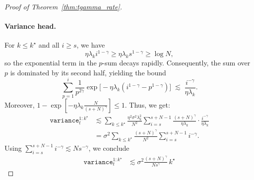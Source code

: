 \documentclass{article}
\def\variance{\mathtt{variance}}
\def\variance{\mathtt{variance}}
\theoremstyle{plain}
\def\variance{\mathtt{variance}}
\begin{document}
\begin{proof}[Proof of Theorem~\ref{thm:tgamma_rate}]
\paragraph{Variance head.}
For \(k \le k^\star\) and all \(i \ge s\), we have
\[
\eta \lambda_k i^{1-\gamma} \ge \eta \lambda_k s^{1-\gamma} \ge \log N,
\]
so the exponential term in the \(p\)-sum decays rapidly. Consequently, the sum
over \(p\) is dominated by its second half, yielding the bound
\[
\sum_{p=1}^{i} \frac{1}{p^{2\gamma}}
\exp\Big[-\eta \lambda_k(i^{1-\gamma} - p^{1-\gamma})\Big]
\;\lesssim\;
\frac{i^{-\gamma}}{\eta \lambda_k}.
\]
Moreover,
\(
1 - \exp[-\eta \lambda_k \tfrac{N}{(s+N)^\gamma}] \le 1
\).
Thus, we get:
\begin{align*}
\variance_t^{1:k^\star}
&\lesssim
\sum_{k\le k^\star}
\frac{\eta^2 \sigma^2 \lambda_k^2}{N^2}
\sum_{i=s}^{s+N-1}
\frac{(s+N)^\gamma}{\eta \lambda_k}
\cdot
\frac{i^{-\gamma}}{\eta \lambda_k} \\
&=
\sigma^2
\sum_{k\le k^\star}
\frac{(s+N)^\gamma}{N^2}
\sum_{i=s}^{s+N-1} i^{-\gamma}.
\end{align*}
Using \(\sum_{i=s}^{s+N-1} i^{-\gamma} \lesssim N s^{-\gamma}\), we conclude
\begin{align*}
\variance_t^{1:k^\star}
&\lesssim
\sigma^2
\frac{(s+N)^\gamma}{N s^\gamma}\, k^\star
\label{eq:var_head_clean}
\end{align*}


\end{proof}
\end{document}
